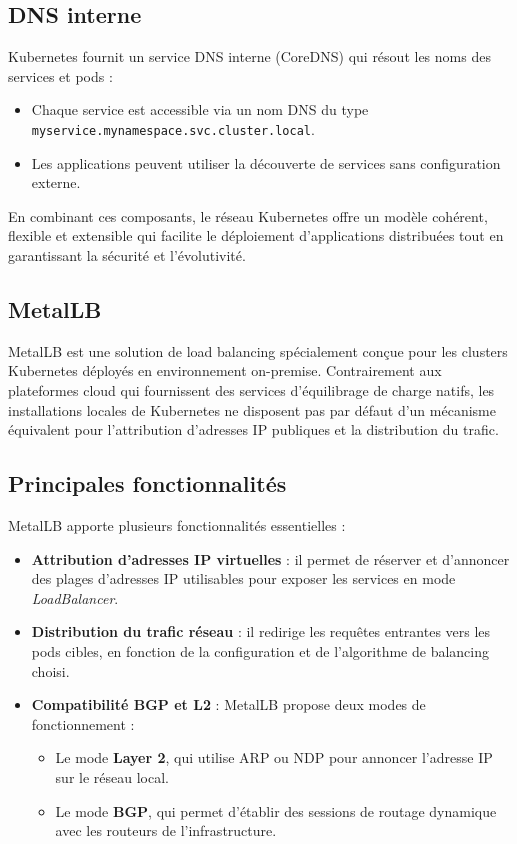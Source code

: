 \subsection{DNS interne}

Kubernetes fournit un service DNS interne (CoreDNS) qui résout les noms des services et pods :
\begin{itemize}
	\item Chaque service est accessible via un nom DNS du type \texttt{myservice.mynamespace.svc.cluster.local}.
	\item Les applications peuvent utiliser la découverte de services sans configuration externe.
\end{itemize}

En combinant ces composants, le réseau Kubernetes offre un modèle cohérent, flexible et extensible qui facilite le déploiement d’applications distribuées tout en garantissant la sécurité et l’évolutivité.

\subsection{MetalLB}

MetalLB est une solution de load balancing spécialement conçue pour les clusters Kubernetes déployés en environnement on-premise. Contrairement aux plateformes cloud qui fournissent des services d’équilibrage de charge natifs, les installations locales de Kubernetes ne disposent pas par défaut d’un mécanisme équivalent pour l’attribution d’adresses IP publiques et la distribution du trafic.

\subsection{Principales fonctionnalités}

MetalLB apporte plusieurs fonctionnalités essentielles :
\begin{itemize}
	\item \textbf{Attribution d’adresses IP virtuelles} : il permet de réserver et d’annoncer des plages d’adresses IP utilisables pour exposer les services en mode \emph{LoadBalancer}.
	\item \textbf{Distribution du trafic réseau} : il redirige les requêtes entrantes vers les pods cibles, en fonction de la configuration et de l’algorithme de balancing choisi.
	\item \textbf{Compatibilité BGP et L2} : MetalLB propose deux modes de fonctionnement :
	      \begin{itemize}
		      \item Le mode \textbf{Layer 2}, qui utilise ARP ou NDP pour annoncer l’adresse IP sur le réseau local.
		      \item Le mode \textbf{BGP}, qui permet d’établir des sessions de routage dynamique avec les routeurs de l’infrastructure.
	      \end{itemize}
\end{itemize}

